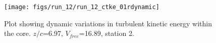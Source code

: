\begin{figure}[H]
\centering
\texttt{[image: figs/run\_12/run\_12\_ctke\_01rdynamic]}
\caption{Plot showing dynamic variations in turbulent kinetic energy within the core. $z/c$=6.97, $V_{free}$=16.89, station 2.}
\label{fig:run_12_ctke_01rdynamic}
\end{figure}


